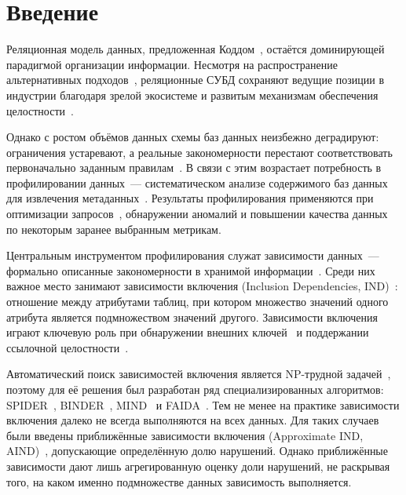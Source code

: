 
\section*{Введение}
\thispagestyle{withCompileDate}

Реляционная модель данных, предложенная Коддом~\cite{codd1970relational}, остаётся доминирующей парадигмой организации информации. Несмотря на распространение альтернативных подходов~\cite{davoudian2018survey}, реляционные СУБД сохраняют ведущие позиции в индустрии благодаря зрелой экосистеме и развитым механизмам обеспечения целостности~\cite{abiteboul1995foundations}.

Однако с ростом объёмов данных схемы баз данных неизбежно деградируют: ограничения устаревают, а реальные закономерности перестают соответствовать первоначально заданным правилам~\cite{abedjan2015profiling}. В связи с этим возрастает потребность в профилировании данных~--- систематическом анализе содержимого баз данных для извлечения метаданных~\cite{naumann2014data, abedjan2018data}. Результаты профилирования применяются при оптимизации запросов~\cite{chaudhuri1998overview}, обнаружении аномалий и повышении качества данных~\cite{rahm2000data} по некоторым заранее выбранным метрикам.

Центральным инструментом профилирования служат зависимости данных~--- формально описанные закономерности в хранимой информации~\cite{liu2012discover}. Среди них важное место занимают зависимости включения (Inclusion Dependencies, IND)~\cite{casanova1984inclusion, de2002unary}: отношение между атрибутами таблиц, при котором множество значений одного атрибута является подмножеством значений другого. Зависимости включения играют ключевую роль при обнаружении внешних ключей~\cite{rostin2009framework} и поддержании ссылочной целостности~\cite{levene2000justification}.

Автоматический поиск зависимостей включения является NP-трудной задачей~\cite{kantola1992discovering}, поэтому для её решения был разработан ряд специализированных алгоритмов: SPIDER~\cite{bauckmann2006efficiently}, BINDER~\cite{papenbrock2015divide}, MIND~\cite{de2002unary} и FAIDA~\cite{kruse2018fast}. Тем не менее на практике зависимости включения далеко не всегда выполняются на всех данных. Для таких случаев были введены приближённые зависимости включения (Approximate IND, AIND)~\cite{kruse2018fast}, допускающие определённую долю нарушений. Однако приближённые зависимости дают лишь агрегированную оценку доли нарушений, не раскрывая того, на каком именно подмножестве данных зависимость выполняется.

